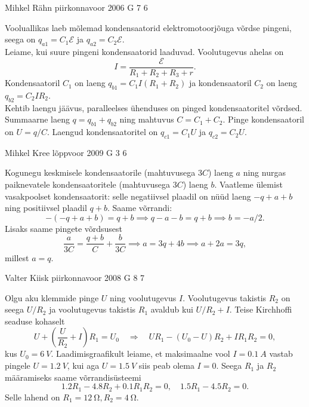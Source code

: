\documentclass[11pt]{article}
\begin{document}
{%
{Mihkel Rähn} %
{piirkonnavoor} %
{2006} %
{G 7} %
{6} %
{

\ifSolution
\osa Vooluallikas laeb mõlemad kondensaatorid elektromotoorjõuga võrdse pingeni, seega on $q_{a1} = C_1\mathcal E$ ja $q_{a2} = C_2\mathcal E$.\\
\osa Leiame, kui suure pingeni kondensaatorid laaduvad. Voolutugevus ahelas
on
\[
I = \frac{\mathcal E}{R_1+R_2+R_3+r}.
\]
Kondensaatoril $C_1$ on laeng $q_{b1} = C_1I(R_1 + R_2)$ ja kondensaatoril $C_2$ on laeng $q_{b2} = C_2IR_2$.\\
\osa Kehtib laengu jäävus, paralleelses ühenduses on pinged kondensaatoritel võrdsed. Summaarne laeng $q = q_{b1} + q_{b2}$ ning mahtuvus $C = C_1 + C_2$. Pinge kondensaatoril on $U = q/C$. Laengud kondensaatoritel on $q_{c1} = C_1U$ ja $q_{c2} = C_2U$. 
\fi
}

{Mihkel Kree} %
{lõppvoor} %
{2009} %
{G 3} %
{6} %
{

\ifSolution
Kogunegu keskmisele kondensaatorile (mahtuvusega $3C$) laeng $a$ ning nurgas paiknevatele kondensaatoritele (mahtuvusega $3C$) laeng $b$. Vaatleme ülemist vasakpoolset kondensaatorit: selle negatiivsel plaadil on nüüd laeng $-q+a+b$ ning positiivsel plaadil $q+b$. Saame võrrandi:
\[-(-q+a+b)=q+b \implies q-a-b=q+b \implies b=-a/2.\]
Lisaks saame pingete võrdsusest
\[\frac{a}{3C}=\frac{q+b}{C}+\frac{b}{3C}\implies a=3q+4b\implies a+2a=3q,\]
millest $a=q$.
\fi
}

{Valter Kiisk} %
{piirkonnavoor} %
{2008} %
{G 8} %
{7} %
{

\ifSolution
Olgu aku klemmide pinge $U$ ning voolutugevus $I$. Voolutugevus takistis $R_2$ on seega $U/R_2$ ja voolutugevus takistis $R_1$ avaldub kui $U/R_2 + I$. Teise Kirchhoffi seaduse kohaselt 
\[
U+\left(\frac{U}{R_{2}}+I\right) R_{1}=U_{0} \quad \Rightarrow \quad U R_{1}-\left(U_{0}-U\right) R_{2}+I R_{1} R_{2}=0,
\]
kus $U_0 = \SI{6}{V}$. Laadimisgraafikult leiame, et maksimaalne vool $I = \SI{0,1}{A}$ vastab pingele $U = \SI{1,2}{V}$, kui aga $U = \SI{1,5}{V}$ siis peab olema $I = 0$. Seega $R_1$ ja $R_2$ määramiseks saame võrrandisüsteemi 
\[
\num{1,2}R_1 - \num{4,8}R_2 + \num{0,1}R_1R_2 = 0, \quad \num{1,5}R_1 - \num{4,5}R_2 = 0. 
\]
Selle lahend on $R_1 = \SI{12}{\ohm}, R_2 = \SI{4}{\ohm}$.
\fi
}

}
\end{document}
